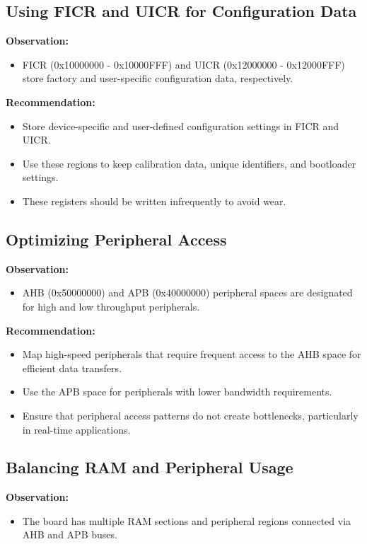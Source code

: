 \documentclass{Configuration_Files/PoliMi3i_thesis}
\begin{document}
\subsection{Using FICR and UICR for Configuration Data}
\textbf{Observation:}
\begin{itemize}
    \item FICR (0x10000000 - 0x10000FFF) and UICR (0x12000000 - 0x12000FFF) store factory and user-specific configuration data, respectively.
\end{itemize}

\textbf{Recommendation:}
\begin{itemize}
    \item Store device-specific and user-defined configuration settings in FICR and UICR.
    \item Use these regions to keep calibration data, unique identifiers, and bootloader settings.
    \item These registers should be written infrequently to avoid wear.
\end{itemize}

\subsection{Optimizing Peripheral Access}
\textbf{Observation:}
\begin{itemize}
    \item AHB (0x50000000) and APB (0x40000000) peripheral spaces are designated for high and low throughput peripherals.
\end{itemize}

\textbf{Recommendation:}
\begin{itemize}
    \item Map high-speed peripherals that require frequent access to the AHB space for efficient data transfers.
    \item Use the APB space for peripherals with lower bandwidth requirements.
    \item Ensure that peripheral access patterns do not create bottlenecks, particularly in real-time applications.
\end{itemize}

\subsection{Balancing RAM and Peripheral Usage}
\textbf{Observation:}
\begin{itemize}
    \item The board has multiple RAM sections and peripheral regions connected via AHB and APB buses.
\end{itemize}
\end{document}
